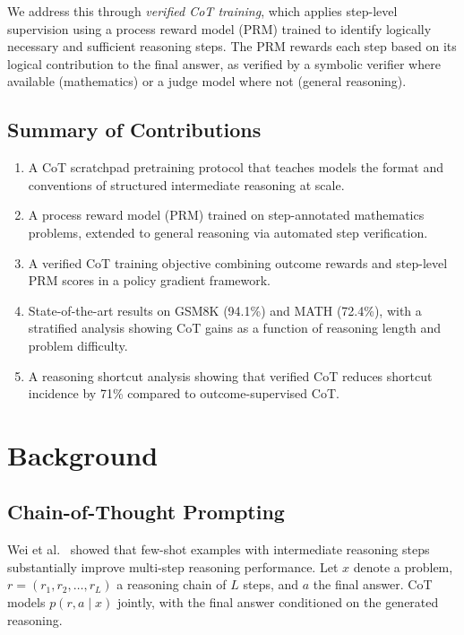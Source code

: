 \documentclass[11pt,a4paper]{article}
\begin{document}
We address this through \emph{verified CoT training}, which applies step-level
supervision using a process reward model (PRM) trained to identify logically necessary
and sufficient reasoning steps. The PRM rewards each step based on its logical
contribution to the final answer, as verified by a symbolic verifier where available
(mathematics) or a judge model where not (general reasoning).

\subsection{Summary of Contributions}

\begin{enumerate}
    \item A CoT scratchpad pretraining protocol that teaches models the format and
          conventions of structured intermediate reasoning at scale.
    \item A process reward model (PRM) trained on step-annotated mathematics problems,
          extended to general reasoning via automated step verification.
    \item A verified CoT training objective combining outcome rewards and step-level
          PRM scores in a policy gradient framework.
    \item State-of-the-art results on GSM8K (94.1\%) and MATH (72.4\%), with a
          stratified analysis showing CoT gains as a function of reasoning length and
          problem difficulty.
    \item A reasoning shortcut analysis showing that verified CoT reduces shortcut
          incidence by 71\% compared to outcome-supervised CoT.
\end{enumerate}

\section{Background}
\label{sec:background}

\subsection{Chain-of-Thought Prompting}

Wei et al.~\cite{wei2022cot} showed that few-shot examples with intermediate reasoning
steps substantially improve multi-step reasoning performance. Let $x$ denote a problem,
$r = (r_1, r_2, \ldots, r_L)$ a reasoning chain of $L$ steps, and $a$ the final answer.
CoT models $p(r, a \mid x)$ jointly, with the final answer conditioned on the generated
reasoning.
\end{document}
